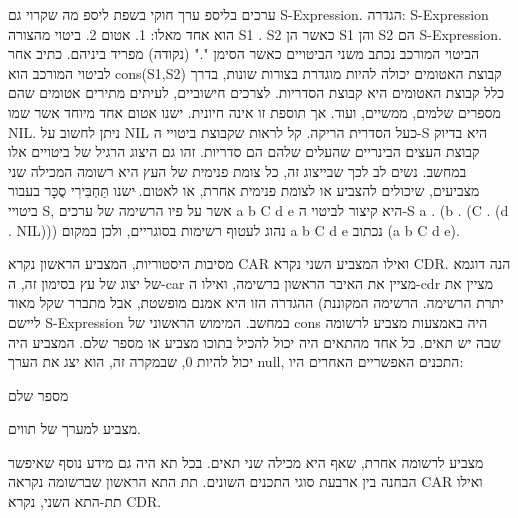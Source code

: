       ערכים בליספ
      ערך חוקי בשפת ליספ מה שקרוי גם S-Expression.
      הגדרה: S-Expression הוא אחד מאלו:
      1. אטום
      2. ביטוי מהצורה S1 . S2 כאשר הן S1 והן S2 הם
      S-Expression. הביטוי המורכב נכתב משני הביטויים
      כאשר הסימן "." (נקודה) מפריד ביניהם. כתיב אחר
      לביטוי המורכב הוא cons(S1,S2) קבוצת האטומים
      יכולה להיות מוגדרת בצורות שונות, בדרך כלל
      קבוצת האטומים היא קבוצת הסדריות. לצרכים
      חישוביים, לעיתים מתירים אטומים שהם מספרים
      שלמים, ממשיים, ועוד. אך תוספת זו אינה חיונית.
      ישנו אטום אחד מיוחד אשר שמו NIL. ניתן לחשוב על
      NIL כעל הסדרית הריקה.
      קל לראות שקבוצת ביטויי ה-S היא בדיוק קבוצת העצים הבינריים שהעלים שלהם הם סדריות. זהו גם היצוג הרגיל של ביטויים אלו במחשב. נשים לב לכך שבייצוג זה, כל צומת פנימית של העץ היא רשומה המכילה שני מצביעים, שיכולים להצביע או לצומת פנימית אחרת, או לאטום.
      ּישנו תַּחְבִּירִי סֻכָּר בעבור ביטויי S, אשר על פיו הרשימה של ערכים a b C d e היא קיצור לביטוי ה-S
      a . (b . (C . (d . NIL)))
      נהוג לעטוף רשימות בסוגריים, ולכן במקום a b C d e נכתוב (a b C d e).

      מסיבות היסטוריות, המצביע הראשון נקרא CAR ואילו המצביע השני נקרא CDR. הנה דוגמא
      של יצוג של עץ בסימון זה, ה-car מציין את האיבר הראשון ברשימה, ואילו ה-cdr מציין
      את יתרת הרשימה. הרשימה המקוננת)
      ההגדרה הזו היא אמנם מופשטת, אבל מתברר שקל מאוד ליישם S-Expression במחשב. המימוש הראשוני של cons היה באמצעות מצביע לרשומה שבה יש תאים. כל אחד מהתאים היה יכול להכיל בתוכו מצביע או מספר שלם. המצביע היה יכול להיות 0, שבמקרה זה, הוא יצג את הערך null,
      התכנים האפשריים האחרים היו:
      \begin{ציינון}
\item מספר שלם
\item מצביע למערך של תווים.
\item מצביע לרשומה אחרת, שאף היא מכילה שני תאים.
      בכל תא היה גם מידע נוסף שאיפשר הבחנה בין ארבעת סוגי התכנים השונים.
      תת התא הראשון שברשומה נקראה CAR ואילו תת-התא השני, נקרא CDR.
  \end{ציינון}

